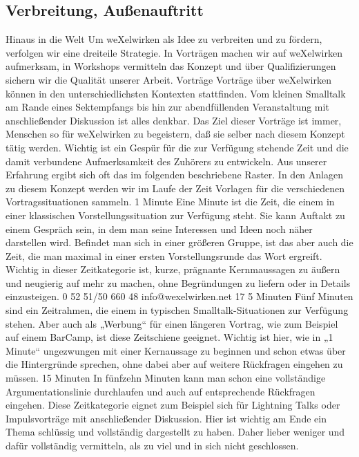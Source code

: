 \subsection{Verbreitung, Außenauftritt}
Hinaus in die Welt
Um weXelwirken als Idee zu verbreiten und zu fördern, verfolgen wir eine dreiteile Strategie. In 
Vorträgen machen wir auf weXelwirken aufmerksam, in Workshops vermitteln das Konzept und über 
Qualifizierungen sichern wir die Qualität unserer Arbeit.
Vorträge
Vorträge über weXelwirken können in den unterschiedlichsten Kontexten stattfinden. Vom kleinen 
Smalltalk am Rande eines Sektempfangs bis hin zur abendfüllenden Veranstaltung mit anschließender 
Diskussion ist alles denkbar. Das Ziel dieser Vorträge ist immer, Menschen so für weXelwirken zu 
begeistern, daß sie selber nach diesem Konzept tätig werden. Wichtig ist ein Gespür für die zur 
Verfügung stehende Zeit und die damit verbundene Aufmerksamkeit des Zuhörers zu entwickeln. Aus 
unserer Erfahrung ergibt sich oft das im folgenden beschriebene Raster. In den Anlagen zu diesem 
Konzept werden wir im Laufe der Zeit Vorlagen für die verschiedenen Vortragssituationen sammeln.
1 Minute
Eine Minute ist die Zeit, die einem in einer klassischen Vorstellungssituation zur Verfügung steht. Sie 
kann Auftakt zu einem Gespräch sein, in dem man seine Interessen und Ideen noch näher darstellen 
wird. Befindet man sich in einer größeren Gruppe, ist das aber auch die Zeit, die man maximal in einer 
ersten Vorstellungsrunde das Wort ergreift.
Wichtig in dieser Zeitkategorie ist, kurze, prägnante Kernmaussagen zu äußern und neugierig auf mehr 
zu machen, ohne Begründungen zu liefern oder in Details einzusteigen. 
0 52 51/50 660 48
info@wexelwirken.net
17
5 Minuten
Fünf Minuten sind ein Zeitrahmen, die einem in typischen Smalltalk-Situationen zur Verfügung stehen. 
Aber auch als „Werbung“ für einen längeren Vortrag, wie zum Beispiel auf einem BarCamp, ist diese 
Zeitschiene geeignet.
Wichtig ist hier, wie in „1 Minute“ ungezwungen mit einer Kernaussage zu beginnen und schon etwas 
über die Hintergründe sprechen, ohne dabei aber auf weitere Rückfragen eingehen zu müssen.
15 Minuten
In fünfzehn Minuten kann man schon eine vollständige Argumentationslinie durchlaufen und auch auf 
entsprechende Rückfragen eingehen. Diese Zeitkategorie eignet zum Beispiel sich für Lightning Talks 
oder Impulsvorträge mit anschließender Diskussion.
Hier ist wichtig am Ende ein Thema schlüssig und vollständig dargestellt zu haben. Daher lieber 
weniger und dafür vollständig vermitteln, als zu viel und in sich nicht geschlossen.
